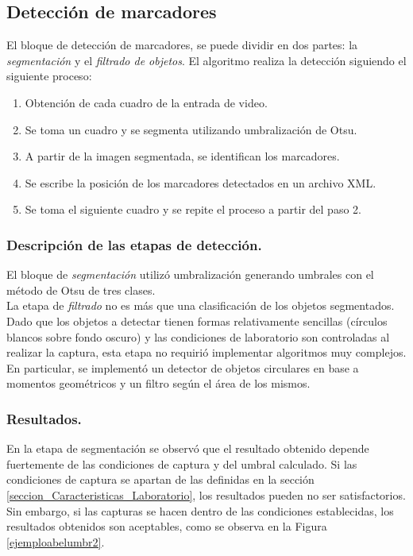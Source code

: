 \subsection{Detección de marcadores}
El bloque de detección de marcadores, se puede dividir en dos partes: la \textit{segmentación} y el \textit{filtrado de objetos}.
%
El algoritmo realiza la detección siguiendo el siguiente proceso:
%
\begin{enumerate}
  \item Obtención de cada cuadro de la entrada de video.
  \item Se toma un cuadro y se segmenta utilizando umbralización de Otsu.
  \item A partir de la imagen segmentada, se identifican los marcadores.
  \item Se escribe la posición de los marcadores detectados en un archivo XML.
  \item Se toma el siguiente cuadro y se repite el proceso a partir del paso 2.
\end{enumerate}
\vspace{-0.4cm} 
\subsubsection{Descripción de las etapas de detección.}
El bloque de \textit{segmentación} utilizó umbralización generando umbrales con el método de Otsu\cite{otsu} de tres clases.\\
%
La etapa de \textit{filtrado} no es más que una clasificación de los objetos segmentados. Dado que los objetos a detectar tienen formas relativamente sencillas (círculos blancos sobre fondo oscuro) y las condiciones de laboratorio son controladas al realizar la captura, esta etapa no requirió implementar algoritmos muy complejos. En particular, se implementó un detector de objetos circulares en base a momentos geométricos\cite{imageMoments} y un filtro según el área de los mismos.
\vspace{-0.3cm} 
\subsubsection{Resultados.}
En la etapa de segmentación se observó que el resultado obtenido depende fuertemente de las condiciones de captura y del umbral calculado. Si las condiciones de captura se apartan de las definidas en la sección \ref{seccion_Caracteristicas_Laboratorio}, los resultados pueden no ser satisfactorios. Sin embargo, si las capturas se hacen dentro de las condiciones establecidas, los resultados obtenidos son aceptables, como se observa en la Figura \ref{ejemploabelumbr2}.


